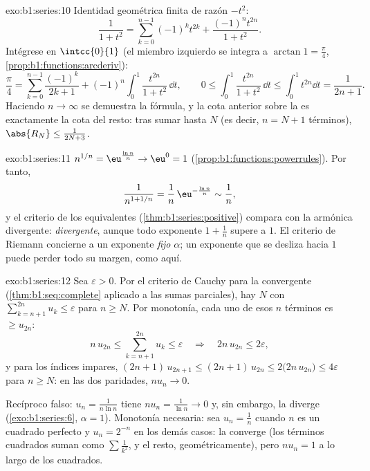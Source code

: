 \begin{solution}{exo:b1:series:10}
Identidad geométrica finita de razón $-t^2$:
\[
\frac{1}{1 + t^2} = \sum_{k=0}^{n-1} (-1)^k t^{2k}
+ \frac{(-1)^n t^{2n}}{1 + t^2} .
\]
Intégrese en $\intcc{0}{1}$ (el miembro izquierdo se integra a
$\arctan 1 = \frac\pi4$, \cref{prop:b1:functions:arcderiv}):
\[
\frac{\pi}{4} = \sum_{k=0}^{n-1} \frac{(-1)^k}{2k+1}
+ (-1)^n \int_0^1 \frac{t^{2n}}{1+t^2}\,\dd t,
\qquad
0 \leq \int_0^1 \frac{t^{2n}}{1+t^2}\,\dd t \leq \int_0^1 t^{2n}\dd
t = \frac{1}{2n+1} .
\]
Haciendo $n \to \infty$ se demuestra la fórmula, y la cota anterior
sobre la  es exactamente la cota del resto: tras sumar hasta
$N$ (es decir, $n = N + 1$ términos), $\abs{R_N} \leq \frac{1}{2N + 3}$.
\end{solution}

\begin{solution}{exo:b1:series:11}
$n^{1/n} = \eu^{\frac{\ln n}{n}} \to \eu^0 = 1$
(\cref{prop:b1:functions:powerrules}). Por tanto,
\[
\frac{1}{n^{1 + 1/n}} = \frac{1}{n}\,\eu^{-\frac{\ln n}{n}}
\sim \frac{1}{n} ,
\]
y el criterio de los equivalentes (\cref{thm:b1:series:positive})
compara con la  armónica divergente: \emph{divergente}, aunque
todo exponente $1 + \frac1n$ supere a $1$. El criterio de Riemann
concierne a un exponente \emph{fijo} $\alpha$; un exponente que se
desliza hacia $1$ puede perder todo su margen, como aquí.
\end{solution}

\begin{solution}{exo:b1:series:12}
Sea $\varepsilon > 0$. Por el criterio de Cauchy para la 
convergente (\cref{thm:b1:seq:complete} aplicado a las sumas
parciales), hay $N$ con $\sum_{k=n+1}^{2n} u_k \leq \varepsilon$ para
$n \geq N$. Por monotonía, cada uno de esos $n$ términos es
$\geq u_{2n}$:
\[
n\,u_{2n} \leq \sum_{k=n+1}^{2n} u_k \leq \varepsilon
\quad\Longrightarrow\quad 2n\,u_{2n} \leq 2\varepsilon ,
\]
y para los índices impares,
$(2n+1)\,u_{2n+1} \leq (2n+1)\,u_{2n} \leq
2\bigl(2n\,u_{2n}\bigr) \leq 4\varepsilon$ para $n \geq N$: en las
dos paridades, $n u_n \to 0$.

Recíproco falso: $u_n = \frac{1}{n\ln n}$ tiene
$n u_n = \frac{1}{\ln n} \to 0$ y, sin embargo, la  diverge
(\cref{exo:b1:series:6}, $\alpha = 1$). Monotonía necesaria: sea
$u_n = \frac1n$ cuando $n$ es un cuadrado perfecto y $u_n = 2^{-n}$
en los demás casos: la  converge (los términos cuadrados suman
como $\sum \frac{1}{k^2}$, y el resto, geométricamente), pero
$n u_n = 1$ a lo largo de los cuadrados.
\end{solution}

